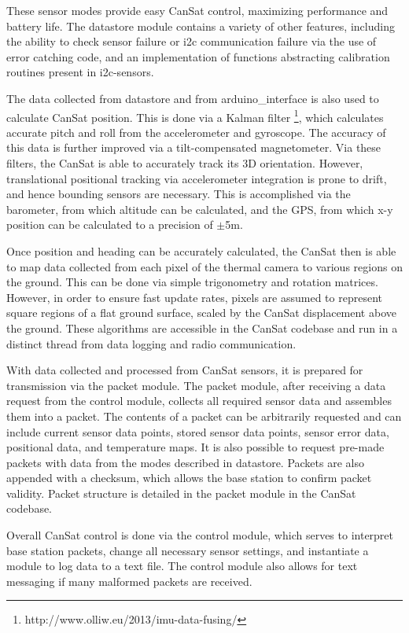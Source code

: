 \documentclass[]{report}
\begin{document}
These sensor modes provide easy CanSat control, maximizing performance and battery life. The datastore module contains a variety of other features, including the ability to check sensor failure or i2c communication failure via the use of error catching code, and an implementation of functions abstracting calibration routines present in i2c-sensors.

The data collected from datastore and from arduino\_interface is also used to calculate CanSat position. This is done via a Kalman filter \footnote{http://www.olliw.eu/2013/imu-data-fusing/}, which calculates accurate pitch and roll from the accelerometer and gyroscope. The accuracy of this data is further improved via a tilt-compensated magnetometer. Via these filters, the CanSat is able to accurately track its 3D orientation.
However, translational positional tracking via accelerometer integration is prone to drift, and hence bounding sensors are necessary. This is accomplished via the barometer, from which altitude can be calculated, and the GPS, from which x-y position can be calculated to a precision of $\pm$5m.

Once position and heading can be accurately calculated, the CanSat then is able to map data collected from each pixel of the thermal camera to various regions on the ground. This can be done via simple trigonometry and rotation matrices. However, in order to ensure fast update rates, pixels are assumed to represent square regions of a flat ground surface, scaled by the CanSat displacement above the ground. These algorithms are accessible in the CanSat codebase and run in a distinct thread from data logging and radio communication. 

With data collected and processed from CanSat sensors, it is prepared for transmission via the packet module. The packet module, after receiving a data request from the control module, collects all required sensor data and assembles them into a packet. The contents of a packet can be arbitrarily requested and can include current sensor data points, stored sensor data points, sensor error data, positional data, and temperature maps. It is also possible to request pre-made packets with data from the modes described in datastore. Packets are also appended with a checksum, which allows the base station to confirm packet validity. Packet structure is detailed in the packet module in the CanSat codebase. 

Overall CanSat control is done via the control module, which serves to interpret base station packets, change all necessary sensor settings, and instantiate a module to log data to a text file. The control module also allows for text messaging if many malformed packets are received.
\end{document}
